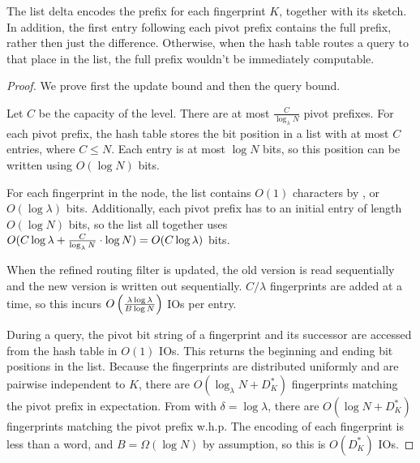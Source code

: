 The list delta encodes the prefix for each fingerprint $K$, together with its
sketch. In addition, the first entry following each pivot prefix contains the
full prefix, rather then just the difference. Otherwise, when the hash table
routes a query to that place in the list, the full prefix wouldn't be
immediately computable.


\begin{proof}
	We prove first the update bound and then the query bound.
	
	Let $C$ be the capacity of the level. There are at most
	$\frac{C}{\log_\lambda N}$ pivot prefixes. For each pivot prefix, the hash
	table stores the bit position in a list with at most $C$ entries, where $C
	\leq N$.  Each entry is at most $\log N$ bits, so this position can be
	written using $O(\log N)$ bits.

	For each fingerprint in the node, the list contains $O(1)$ characters by
	, or $O(\log \lambda)$ bits. Additionally, each
	pivot prefix has to an initial entry of length $O(\log N)$ bits, so the
	list all together uses $O(C\log\lambda + \frac{C}{\log_\lambda N} \cdot
	\log N)= O(C\log\lambda{})$ bits.

	When the refined routing filter is updated, the old version is read
	sequentially and the new version is written out sequentially. $C/\lambda$
	fingerprints are added at a time, so this incurs
	$O\left(\frac{\lambda\log\lambda{}}{B\log N}\right)$ IOs per entry.

	During a query, the pivot bit string of a fingerprint and its successor are
	accessed from the hash table in $O(1)$ IOs. This returns the beginning and
	ending bit positions in the list. Because the fingerprints are distributed
	uniformly and are pairwise independent to $K$, there are $O(\log_\lambda
	N + D_K^*)$ fingerprints matching the pivot prefix in expectation.  From
	 with $\delta=\log\lambda$, there are $O(\log N +
	D_K^*)$ fingerprints matching the pivot prefix w.h.p. The encoding of each
	fingerprint is less than a word, and $B=\Omega(\log N)$ by assumption, so
	this is $O(D_K^*)$ IOs.
\end{proof}

